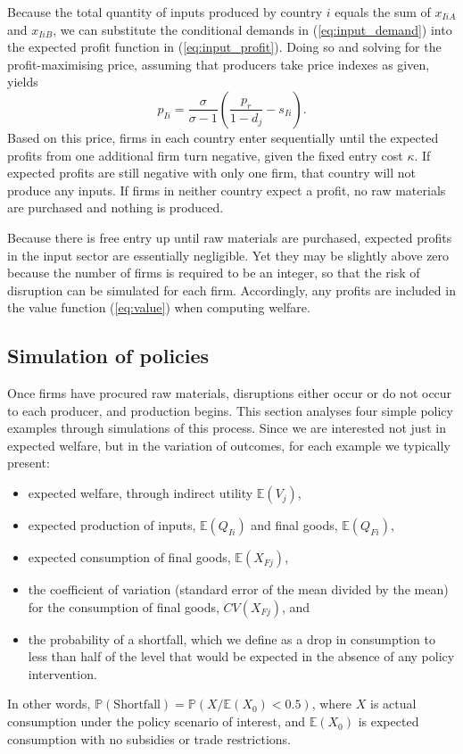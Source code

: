 \documentclass{article}
\begin{document}
Because the total quantity of inputs produced by country $i$ equals the sum of $x_{IiA}$ and $x_{IiB}$, we can substitute the conditional demands in (\ref{eq:input_demand}) into the expected profit function in (\ref{eq:input_profit}). Doing so and solving for the profit-maximising price, assuming that producers take price indexes as given, yields
\begin{equation}
    p_{Ii} = \frac{\sigma}{\sigma - 1} \left( \frac{p_r}{1 - d_j} - s_{Ii} \right) .
\end{equation}
Based on this price, firms in each country enter sequentially until the expected profits from one additional firm turn negative, given the fixed entry cost $\kappa$. If expected profits are still negative with only one firm, that country will not produce any inputs. If firms in neither country expect a profit, no raw materials are purchased and nothing is produced.

Because there is free entry up until raw materials are purchased, expected profits in the input sector are essentially negligible. Yet they may be slightly above zero because the number of firms is required to be an integer, so that the risk of disruption can be simulated for each firm. Accordingly, any profits are included in the value function (\ref{eq:value}) when computing welfare.

\subsection{Simulation of policies}

Once firms have procured raw materials, disruptions either occur or do not occur to each producer, and production begins. This section analyses four simple policy examples through simulations of this process. Since we are interested not just in expected welfare, but in the variation of outcomes, for each example we typically present:
\begin{itemize}
    \item expected welfare, through indirect utility $\mathbb{E} (V_j)$, 
    \item expected production of inputs, $\mathbb{E} (Q_{Ii})$ and final goods, $\mathbb{E} (Q_{Fi})$, 
    \item expected consumption of final goods, $\mathbb{E} (X_{Fj})$, 
    \item the coefficient of variation (standard error of the mean divided by the mean) for the consumption of final goods, $CV (X_{Fj})$, and
    \item the probability of a shortfall, which we define as a drop in consumption to less than half of the level that would be expected in the absence of any policy intervention.
\end{itemize}
In other words, $\mathbb{P}(\text{Shortfall}) = \mathbb{P} (X / \mathbb{E}(X_0) < 0.5)$, where $X$ is actual consumption under the policy scenario of interest, and $\mathbb{E} (X_0)$ is expected consumption with no subsidies or trade restrictions.
\end{document}
